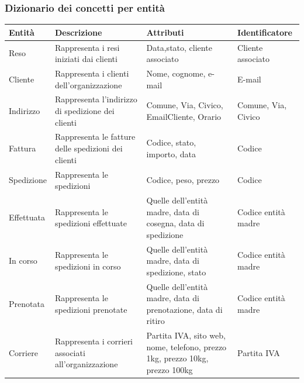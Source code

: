 \documentclass[a4paper,12pt]{article}
\begin{document}
\subsubsection{Dizionario dei concetti per entità}
\begin{table}[H]
	\centering
	\begin{tabularx}{\dimexpr{}\arrayrulewidth}{|*{4}{Y|}} %
		\hline
		\textbf{Entità} & \textbf{Descrizione} & \textbf{Attributi} & \textbf{Identificatore} \\ \hline
		 Reso & Rappresenta i resi iniziati dai clienti & Data,stato, cliente associato & Cliente associato \\
		 \hline
		 Cliente & Rappresenta i clienti dell'organizzazione & Nome, cognome, e-mail & E-mail \\
		\hline 
		Indirizzo & Rappresenta l'indirizzo di spedizione dei clienti & Comune, Via, Civico, EmailCliente, Orario & Comune, Via, Civico \\ 
		\hline
		Fattura & Rappresenta le fatture delle spedizioni dei clienti & Codice, stato, importo, data & Codice\\
		\hline
		Spedizione & Rappresenta le spedizioni & Codice, peso, prezzo & Codice \\ 
		\hline
		Effettuata & Rappresenta le spedizioni effettuate & Quelle dell'entità madre, data di cosegna, data di spedizione & Codice entità madre \\
		\hline
		In corso & Rappresenta le spedizioni in corso & Quelle dell'entità madre, data di spedizione, stato & Codice entità madre \\
		\hline
		Prenotata & Rappresenta le spedizioni prenotate & Quelle dell'entità madre, data di prenotazione, data di ritiro & Codice entità madre \\
		\hline
		Corriere & Rappresenta i corrieri associati all'organizzazione & Partita IVA, sito web, nome, telefono, prezzo 1kg, prezzo 10kg, prezzo 100kg & Partita IVA \\
		\hline 
	\end{tabularx}
\end{table}
\end{document}
